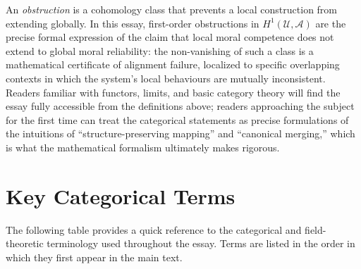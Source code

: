 \documentclass[12pt]{article}
\theoremstyle{definition}
\begin{document}
An \emph{obstruction} is a cohomology class that prevents a local construction
from extending globally. In this essay, first-order obstructions in
$H^1(\mathcal{U}, \mathcal{A})$ are the precise formal expression of the claim
that local moral competence does not extend to global moral reliability: the
non-vanishing of such a class is a mathematical certificate of alignment
failure, localized to specific overlapping contexts in which the system's local
behaviours are mutually inconsistent. Readers familiar with functors, limits,
and basic category theory will find the essay fully accessible from the
definitions above; readers approaching the subject for the first time can treat
the categorical statements as precise formulations of the intuitions of
``structure-preserving mapping'' and ``canonical merging,'' which is what the
mathematical formalism ultimately makes rigorous.

\section{Key Categorical Terms}
\label{app:glossary}

The following table provides a quick reference to the categorical and
field-theoretic terminology used throughout the essay. Terms are listed in
the order in which they first appear in the main text.
\end{document}
